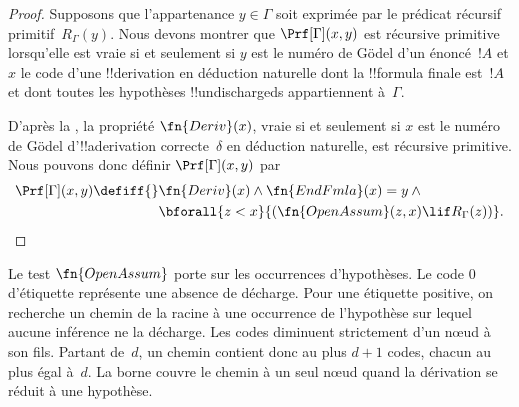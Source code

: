 \documentclass[../../../include/open-logic-section]{subfiles}
\begin{document}
\begin{proof}
  Supposons que l'appartenance $y \in \Gamma$ soit exprimée par le
  prédicat récursif primitif~$R_\Gamma(y)$. Nous devons montrer que
  $\Prf[\Gamma](x, y)$ est récursive primitive lorsqu'elle est vraie
  si et seulement si $y$ est le numéro de G\"odel d'un énoncé~$!A$
  et $x$ le code d'une !!{derivation} en déduction naturelle dont la
  !!{formula} finale est~$!A$ et dont toutes les hypothèses
  !!{undischarged}s appartiennent à~$\Gamma$.

  D'après la , la propriété $\fn{Deriv}(x)$, vraie
  si et seulement si $x$ est le numéro de G\"odel d'!!a{derivation}
  correcte~$\delta$ en déduction naturelle, est récursive
  primitive. Nous pouvons donc définir $\Prf[\Gamma](x, y)$ par
  \begin{align*}
    \Prf[\Gamma](x, y) \defiff {}
    & \fn{Deriv}(x) \land \fn{EndFmla}(x) = y \land {} \\
    & \bforall{z < x}{(\fn{OpenAssum}(z, x) \lif R_\Gamma(z))}.
  \end{align*}
\end{proof}

\begin{explain}
Le test $\fn{OpenAssum}$ porte sur les occurrences d'hypothèses.
Le code $0$ d'étiquette représente une absence de décharge. Pour
une étiquette positive, on recherche un chemin de la racine
à une occurrence de l'hypothèse sur lequel aucune inférence ne
la décharge. Les codes diminuent strictement d'un nœud à son
fils. Partant de~$d$, un chemin contient donc au plus $d+1$
codes, chacun au plus égal à~$d$. La borne couvre le chemin
à un seul nœud quand la dérivation se réduit à une hypothèse.
\end{explain}
\end{document}
